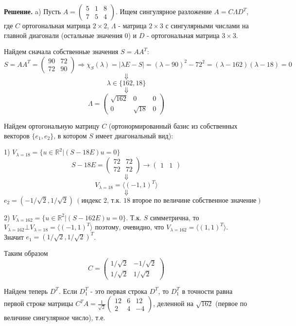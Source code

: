 \documentclass{article}
\begin{document}
{\bf Решение.} a) Пусть $A=\left(\begin{array}{rrr}5 & 1 & 8\\7 & 5 & 4\end{array}\right)$. Ищем сингулярное разложение $A=C\Lambda D^T$, где $C$ ортогональная матрица $2\times2$, $\Lambda$ - матрица $2\times3$ с сингулярными числами на главной диагонали (остальные значения 0) и $D$ - ортогональная матрица $3\times3$.
\par
Найдем сначала собственные значения $S=AA^T$:
$$S=AA^T=\left(\begin{array}{rr}90 & 72\\72 & 90\end{array}\right)\Rightarrow \chi_S(\lambda)=|\lambda E - S|=(\lambda-90)^2-72^2=(\lambda-162)(\lambda-18)=0$$
$$\Downarrow$$
$$\lambda \in \{162, 18\}$$
$$\Downarrow$$
$$\Lambda=\left(\begin{array}{rrr}\sqrt{162} & 0 & 0\\0 & \sqrt{18} & 0\end{array}\right)$$
\par
Найдем ортогональную матрицу $C$ (ортонормированный базис из собственных векторов $\{e_1, e_2\}$, в котором $S$ имеет диагональный вид):
\par
1) $V_{\lambda=18}=\{u\in\mathbb{R}^2|(S-18E)u=0\}$
$$S-18E=\left(\begin{array}{rr}72 & 72\\72 & 72\end{array}\right)\rightarrow \left(\begin{array}{rr}1 & 1\end{array}\right)$$
$$\Downarrow$$
$$V_{\lambda=18}=\langle (-1, 1)^T \rangle$$
$$\Downarrow$$
$$e_2 = (-1/\sqrt{2}, 1/\sqrt{2})\  (\textrm{индекс 2, т.к. 18 второе по величине собственное значение})$$
\par
2) $V_{\lambda=162}=\{u\in\mathbb{R}^2|(S-162E)u=0\}$. Т.к. $S$ симметрична, то $V_{\lambda=162}\bot V_{\lambda=18}=\langle (-1, 1)^T \rangle$ поэтому, очевидно, что $V_{\lambda=162}=\langle (1,1)^T \rangle$. Значит $e_1=(1/\sqrt{2}, 1/\sqrt{2})^T$.
\par
Таким образом
$$C=\left(\begin{array}{rr}1/\sqrt{2} & -1/\sqrt{2}\\1/\sqrt{2} & 1/\sqrt{2}\end{array}\right)$$
\par
Найдем теперь $D^T$. Если $D_1^T$ - это первая строка $D^T$, то $D_1^T$ в точности равна первой строке матрицы $C^TA=\frac{1}{\sqrt{2}}\left(\begin{array}{rrr}12 & 6 & 12\\2 & 4 & -4\end{array}\right)$, деленной на $\sqrt{162}$ (первое по величине сингулярное число), т.е. 
\end{document}
